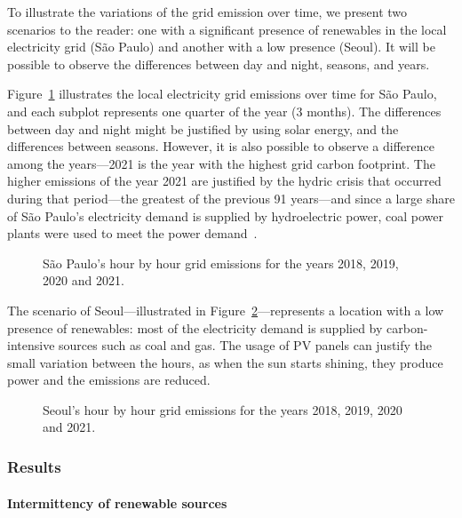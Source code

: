 To illustrate the variations of the grid emission over time, we present two scenarios to the reader: one with a significant presence of renewables in the local electricity grid (São Paulo) and another with a low presence (Seoul). It will be possible to observe the differences between day and night, seasons, and years.


Figure~\ref{fig:co2_sp} illustrates the local electricity grid emissions over time for São Paulo, and each subplot represents one quarter of the year (3 months). The differences between day and night might be justified by using solar energy, and the differences between seasons. However, it is also possible to observe a difference among the years---2021 is the year with the highest grid carbon footprint. The higher emissions of the year 2021 are justified by the hydric crisis that occurred during that period---the greatest of the previous 91 years---and since a large share of São Paulo's electricity demand is supplied by hydroelectric power, coal power plants were used to meet the power demand~\cite{CNN2021_crisehidrica}.

\begin{figure}[H]
  \centering
  {}
  \caption{São Paulo's hour by hour grid emissions for the years 2018, 2019, 2020 and 2021.}
  \label{fig:co2_sp}
\end{figure}

The scenario of Seoul---illustrated in Figure~\ref{fig:co2_seoul}---represents a location with a low presence of renewables: most of the electricity demand is supplied by carbon-intensive sources such as coal and gas. The usage of PV panels can justify the small variation between the hours, as when the sun starts shining, they produce power and the emissions are reduced.

\begin{figure}[H]
  \centering
  {}
  \caption{Seoul's hour by hour grid emissions for the years 2018, 2019, 2020 and 2021.}
  \label{fig:co2_seoul}
\end{figure}




\subsubsection{Results}

\paragraph{Intermittency of renewable sources}

